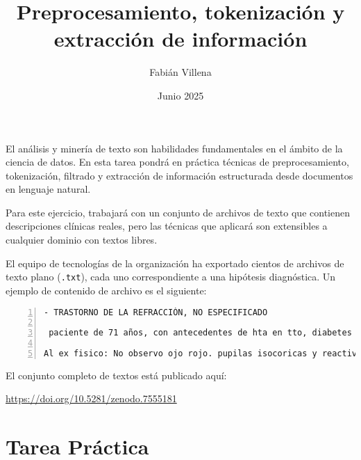 \documentclass{article}
\title{Preprocesamiento, tokenización y extracción de información}
\author{Fabián Villena}
\date{Junio 2025}
\begin{document}
\maketitle

El análisis y minería de texto son habilidades fundamentales en el ámbito de la ciencia de datos. En esta tarea pondrá en práctica técnicas de preprocesamiento, tokenización, filtrado y extracción de información estructurada desde documentos en lenguaje natural.

Para este ejercicio, trabajará con un conjunto de archivos de texto que contienen descripciones clínicas reales, pero las técnicas que aplicará son extensibles a cualquier dominio con textos libres.

El equipo de tecnologías de la organización ha exportado cientos de archivos de texto plano (\texttt{.txt}), cada uno correspondiente a una hipótesis diagnóstica. Un ejemplo de contenido de archivo es el siguiente:

\begin{lstlisting}[breaklines=true, extendedchars=true,numbers=left,frame=single]
- TRASTORNO DE LA REFRACCIÓN, NO ESPECIFICADO

 paciente de 71 años, con antecedentes de hta en tto, diabetes insulinodependiente, dislipidemia, hipotiroidismo en tto, enfermedad renal cronica etapa iii,tabaquismo cronico importante, en febrero de este año lo suspendio. Refiere que tiene principios de Alzheimer y parkinson?????? NO SALE REGISTRO DE DIAGNOSTICOS. Refiere que necesita ic a oftalmologo. Tiene astigmatismo y miopia, ocupa lentes para ambos trastornos de viciorefraccion, refiere que hace 4 meses que ve borroso utilizando lentes ópticos.  Fue operada hace mas de 2 años por retinopatia diabetica en ambos ojos.

Al ex fisico: No observo ojo rojo. pupilas isocoricas y reactivas. no observo opacidades corneales. RFM presente. agudeza visual conservada.
\end{lstlisting}

El conjunto completo de textos está publicado aquí:

\begin{center}
  \url{https://doi.org/10.5281/zenodo.7555181}
\end{center}


\vspace{1em}
\section*{Tarea Práctica}
\end{document}
